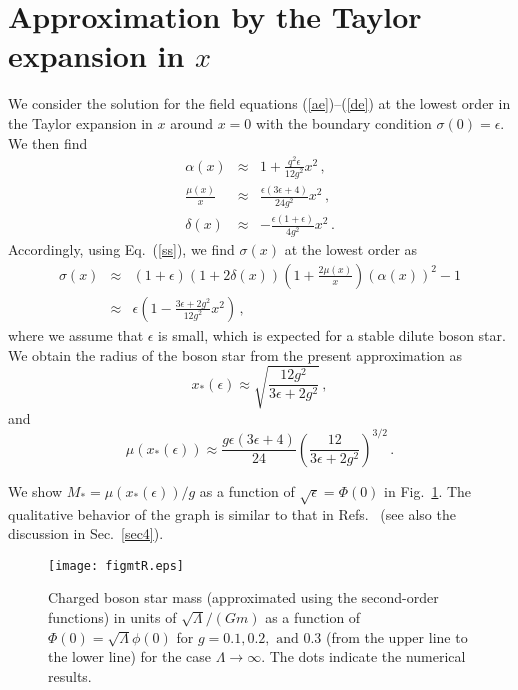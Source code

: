 \documentclass[
aps,prd,
12pt,%
nopreprintnumbers,
showpacs,
eqsecnum,
nofootinbib
]{revtex4-1}
\begin{document}
\section{Approximation by the Taylor expansion in $x$}
\label{ApB}
We consider the solution  for the field
equations  (\ref{ae})--(\ref{de}) at the lowest order in the Taylor expansion in
$x$ around $x=0$ with the boundary condition $\sigma(0)=\epsilon$.
We then find
\begin{eqnarray}
\alpha(x)&\approx&1+\frac{q^2\epsilon}{12 g^2}x^2\,,\\
\frac{\mu(x)}{x}&\approx&\frac{\epsilon(3\epsilon+4)}{24 g^2}x^2\,,\\
\delta(x)&\approx&-\frac{\epsilon(1+\epsilon)}{4 g^2}x^2\,.
\end{eqnarray}
Accordingly, using Eq.~(\ref{ss}), we find $\sigma(x)$ at the lowest order as
\begin{eqnarray}
\sigma(x)&\approx& (1+\epsilon)(1+2\delta(x))
\left(1+\frac{2\mu(x)}{x}\right)(\alpha(x))^2-1\nonumber \\
&\approx&\epsilon\left(1-\frac{3\epsilon+2g^2}{12g^2}x^2\right)\,,
\end{eqnarray}
where we assume that $\epsilon$ is small, which is expected for a stable dilute
boson star. We obtain the radius of the boson star
from the present approximation as
\begin{equation}
x_*(\epsilon)\approx\sqrt{\frac{12g^2}{3\epsilon+2g^2}}\,,
\end{equation}
and
\begin{equation}
\mu(x_*(\epsilon))\approx\frac{g\epsilon(3\epsilon+4)}{24}
\left(\frac{12}{3\epsilon+2g^2}\right)^{3/2}\,.
\end{equation}

We show $M_*=\mu(x_*(\epsilon))/g$ as a function of $\sqrt{\epsilon}=\Phi(0)$
in Fig.~\ref{figmt}. The qualitative behavior of the graph is similar to that in
Refs.~\cite{Jetzer,JB} (see also the discussion in Sec.~\ref{sec4}).

\begin{figure}[ht]
\centering
\texttt{[image: figmtR.eps]}
\caption{
Charged boson star mass (approximated using the second-order functions) in units of
$\sqrt{\Lambda}/(Gm)$ as a function of
$\Phi(0)=\sqrt{\Lambda}\phi(0)$ for $g=0.1, 0.2,\mbox{~and~} 0.3$ (from the upper
line to the lower line) for the case $\Lambda\rightarrow\infty$. The dots indicate
the numerical results.}
\label{figmt}
\end{figure}
\end{document}
